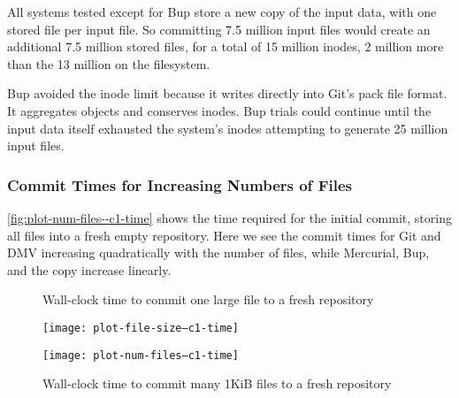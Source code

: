All systems tested except for Bup store a new copy of the input data, with one stored file per input file.
So committing \num{7.5} million input files would create an additional \num{7.5} million stored files, for a total of \num{15} million inodes, \num{2} million more than the \num{13} million on the filesystem.

Bup avoided the \gls{inode} limit because it writes directly into Git's pack file format.
It aggregates objects and conserves inodes.
Bup trials could continue until the input data itself exhausted the system's \glspl{inode} attempting to generate \num{25} million input files.

%


\subsubsection{Commit Times for Increasing Numbers of Files}

\autoref{fig:plot-num-files--c1-time} shows the time required for the initial \gls{commit}, storing all files into a fresh empty \gls{repository}.
Here we see the commit times for Git and DMV increasing quadratically with the number of files, while Mercurial, Bup, and the copy increase linearly.

\begin{figure}
    \centering
    \begin{minipage}{.5\textwidth}

        \caption{Wall-clock time to commit one large file to a fresh repository}
        \label{fig:plot-file-size--c1-time}
        \centering
        \texttt{[image: plot-file-size--c1-time]}

    \end{minipage}%
    \begin{minipage}{.5\textwidth}

        \caption{Wall-clock time to commit many 1KiB files to a fresh repository}
        \label{fig:plot-num-files--c1-time}
        \centering
        \texttt{[image: plot-num-files--c1-time]}

    \end{minipage}
\end{figure}
